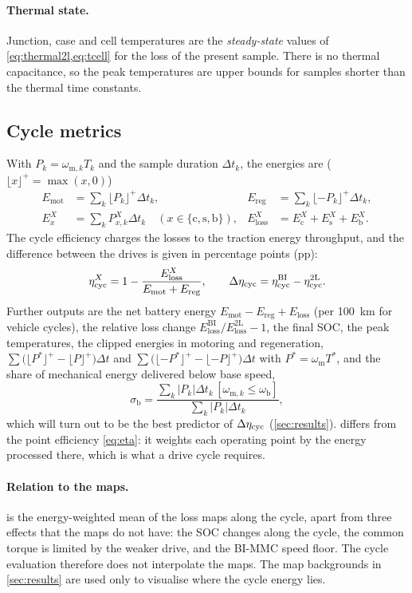 \paragraph{Thermal state.} Junction, case and cell temperatures are the \emph{steady-state} values of \cref{eq:thermal2l,eq:tcell} for the loss of the present sample. There is no thermal capacitance, so the peak temperatures are upper bounds for samples shorter than the thermal time constants.

\subsection{Cycle metrics}\label{sec:metrics}
With $P_k=\omega_{\mathrm{m},k}T_k$ and the sample duration $\Delta t_k$, the energies are ($\lfloor x\rfloor^+=\max(x,0)$)
\begin{align}
E_\mathrm{mot}&=\sum_k\lfloor P_k\rfloor^+\Delta t_k, & E_\mathrm{reg}&=\sum_k\lfloor -P_k\rfloor^+\Delta t_k, \label{eq:energies}\\
E_x^X&=\sum_kP_{x,k}^X\Delta t_k\quad(x\in\{\mathrm{c},\mathrm{s},\mathrm{b}\}),& E_\mathrm{loss}^X&=E_\mathrm{c}^X+E_\mathrm{s}^X+E_\mathrm{b}^X. \label{eq:eloss}
\end{align}
The cycle efficiency charges the losses to the traction energy throughput, and the difference between the drives is given in percentage points (pp):
\begin{equation}
\eta_\mathrm{cyc}^X=1-\frac{E_\mathrm{loss}^X}{E_\mathrm{mot}+E_\mathrm{reg}},\qquad
\Delta\eta_\mathrm{cyc}=\eta_\mathrm{cyc}^\mathrm{BI}-\eta_\mathrm{cyc}^\mathrm{2L}.
\label{eq:etacyc}
\end{equation}
Further outputs are the net battery energy $E_\mathrm{mot}-E_\mathrm{reg}+E_\mathrm{loss}$ (per \SI{100}{\kilo\metre} for vehicle cycles), the relative loss change $E_\mathrm{loss}^\mathrm{BI}/E_\mathrm{loss}^\mathrm{2L}-1$, the final SOC, the peak temperatures, the clipped energies in motoring and regeneration, $\sum\big(\lfloor P^*\rfloor^+-\lfloor P\rfloor^+\big)\Delta t$ and $\sum\big(\lfloor -P^*\rfloor^+-\lfloor -P\rfloor^+\big)\Delta t$ with $P^*=\omega_\mathrm{m}T^*$, and the share of mechanical energy delivered below base speed,
\begin{equation}
\sigma_\mathrm{b}=\frac{\sum_k|P_k|\Delta t_k\,[\omega_{\mathrm{m},k}\le\omega_\mathrm{b}]}{\sum_k|P_k|\Delta t_k},
\label{eq:share}
\end{equation}
which will turn out to be the best predictor of $\Delta\eta_\mathrm{cyc}$ (\cref{sec:results}).  differs from the point efficiency \cref{eq:eta}: it weights each operating point by the energy processed there, which is what a drive cycle requires.

\paragraph{Relation to the maps.}  is the energy-weighted mean of the loss maps along the cycle, apart from three effects that the maps do not have: the SOC changes along the cycle, the common torque is limited by the weaker drive, and the BI-MMC speed floor. The cycle evaluation therefore does not interpolate the maps. The map backgrounds in \cref{sec:results} are used only to visualise where the cycle energy lies.
